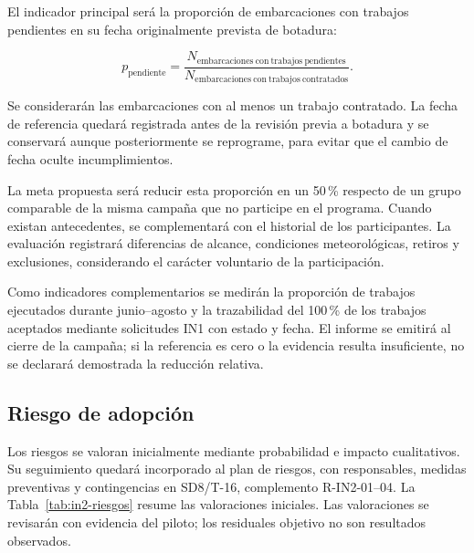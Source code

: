 El indicador principal será la proporción de embarcaciones con
trabajos pendientes en su fecha originalmente prevista de botadura:

\[
p_{\mathrm{pendiente}} =
\frac{N_{\mathrm{embarcaciones\ con\ trabajos\ pendientes}}}
     {N_{\mathrm{embarcaciones\ con\ trabajos\ contratados}}}.
\]

Se considerarán las embarcaciones con al menos un trabajo contratado.
La fecha de referencia quedará registrada antes de la revisión
previa a botadura y se conservará aunque posteriormente se reprograme,
para evitar que el cambio de fecha oculte incumplimientos.

La meta propuesta será reducir esta proporción en un 50\,\%
respecto de un grupo comparable de la misma campaña que no
participe en el programa. Cuando existan antecedentes, se
complementará con el historial de los participantes. La evaluación
registrará diferencias de alcance, condiciones meteorológicas,
retiros y exclusiones, considerando el carácter voluntario
de la participación.

Como indicadores complementarios se medirán la proporción de
trabajos ejecutados durante junio--agosto y la trazabilidad del
100\,\% de los trabajos aceptados mediante solicitudes IN1 con
estado y fecha. El informe se emitirá al cierre de la campaña;
si la referencia es cero o la evidencia resulta insuficiente,
no se declarará demostrada la reducción relativa.


\subsection{Riesgo de adopción}

Los riesgos se valoran inicialmente mediante probabilidad e impacto
cualitativos. Su seguimiento quedará incorporado al plan de riesgos,
con responsables, medidas preventivas y contingencias en SD8/T-16,
complemento R-IN2-01--04. La Tabla~\ref{tab:in2-riesgos} resume las valoraciones iniciales. Las valoraciones se revisarán con evidencia
del piloto; los residuales objetivo no son resultados observados.

